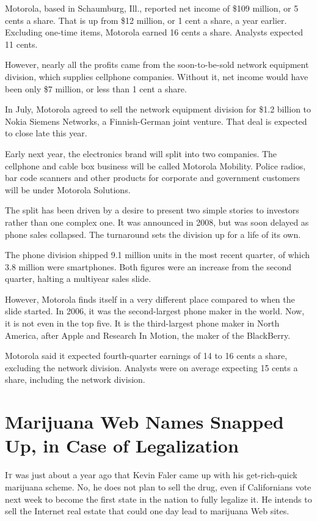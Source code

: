 ﻿\documentclass[12pt]{article}
\begin{document}
Motorola, based in Schaumburg, Ill., reported net income of \$109 million, or 5 cents a share. That
is up from \$12 million, or 1 cent a share, a year earlier. Excluding one-time items, Motorola
earned 16 cents a share. Analysts expected 11 cents.

However, nearly all the profits came from the soon-to-be-sold network equipment division, which
supplies cellphone companies. Without it, net income would have been only \$7 million, or less than
1 cent a share.

In July, Motorola agreed to sell the network equipment division for \$1.2 billion to Nokia Siemens
Networks, a Finnish-German joint venture. That deal is expected to close late this year.

Early next year, the electronics brand will split into two companies. The cellphone and cable box
business will be called Motorola Mobility. Police radios, bar code scanners and other products for
corporate and government customers will be under Motorola Solutions.

The split has been driven by a desire to present two simple stories to investors rather than one
complex one. It was announced in 2008, but was soon delayed as phone sales collapsed. The turnaround
sets the division up for a life of its own.

The phone division shipped 9.1 million units in the most recent quarter, of which 3.8 million were
smartphones. Both figures were an increase from the second quarter, halting a multiyear sales slide.

However, Motorola finds itself in a very different place compared to when the slide started. In
2006, it was the second-largest phone maker in the world. Now, it is not even in the top five. It is
the third-largest phone maker in North America, after Apple and Research In Motion, the maker of the
BlackBerry.

Motorola said it expected fourth-quarter earnings of 14 to 16 cents a share, excluding the network
division. Analysts were on average expecting 15 cents a share, including the network division.

\section{Marijuana Web Names Snapped Up, in Case of Legalization}

\lettrine{I}{t} was just about a year ago that Kevin Faler came up with his
get-rich-quick marijuana scheme. No, he does not plan to sell the drug, even if Californians vote
next week to become the first state in the nation to fully legalize it. He intends to sell the
Internet real estate that could one day lead to marijuana Web sites.
\end{document}
